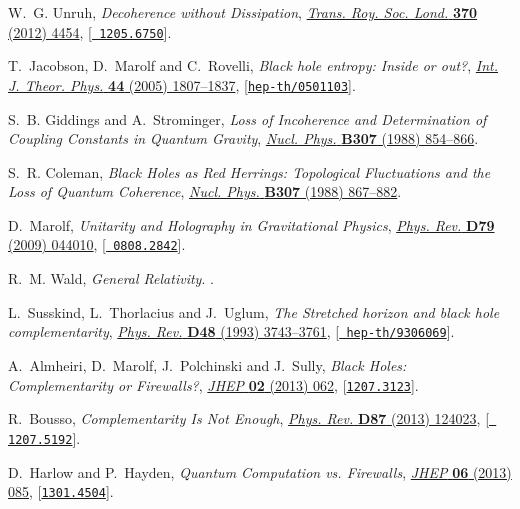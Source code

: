 \documentclass[12pt]{article}
\begin{document}
\begin{thebibliography}{100}
W.~G. Unruh, \emph{{Decoherence without Dissipation}},
  \href{http://dx.doi.org/10.1098/rsta.2012.0163}{\emph{Trans. Roy. Soc. Lond.}
  {\bf 370} (2012) 4454}, [\href{http://arxiv.org/abs/1205.6750}{{\tt
  1205.6750}}].

T.~Jacobson, D.~Marolf and C.~Rovelli, \emph{{Black hole entropy: Inside or
  out?}}, \href{http://dx.doi.org/10.1007/s10773-005-8896-z}{\emph{Int. J.
  Theor. Phys.} {\bf 44} (2005) 1807--1837},
  [\href{http://arxiv.org/abs/hep-th/0501103}{{\tt hep-th/0501103}}].

S.~B. Giddings and A.~Strominger, \emph{{Loss of Incoherence and Determination
  of Coupling Constants in Quantum Gravity}},
  \href{http://dx.doi.org/10.1016/0550-3213(88)90109-5}{\emph{Nucl. Phys.} {\bf
  B307} (1988) 854--866}.

S.~R. Coleman, \emph{{Black Holes as Red Herrings: Topological Fluctuations and
  the Loss of Quantum Coherence}},
  \href{http://dx.doi.org/10.1016/0550-3213(88)90110-1}{\emph{Nucl. Phys.} {\bf
  B307} (1988) 867--882}.

D.~Marolf, \emph{{Unitarity and Holography in Gravitational Physics}},
  \href{http://dx.doi.org/10.1103/PhysRevD.79.044010}{\emph{Phys. Rev.} {\bf
  D79} (2009) 044010}, [\href{http://arxiv.org/abs/0808.2842}{{\tt
  0808.2842}}].

R.~M. Wald, \emph{{General Relativity}}.
.

L.~Susskind, L.~Thorlacius and J.~Uglum, \emph{{The Stretched horizon and black
  hole complementarity}},
  \href{http://dx.doi.org/10.1103/PhysRevD.48.3743}{\emph{Phys. Rev.} {\bf D48}
  (1993) 3743--3761}, [\href{http://arxiv.org/abs/hep-th/9306069}{{\tt
  hep-th/9306069}}].

A.~Almheiri, D.~Marolf, J.~Polchinski and J.~Sully, \emph{{Black Holes:
  Complementarity or Firewalls?}},
  \href{http://dx.doi.org/10.1007/JHEP02(2013)062}{\emph{JHEP} {\bf 02} (2013)
  062}, [\href{http://arxiv.org/abs/1207.3123}{{\tt 1207.3123}}].

R.~Bousso, \emph{{Complementarity Is Not Enough}},
  \href{http://dx.doi.org/10.1103/PhysRevD.87.124023}{\emph{Phys. Rev.} {\bf
  D87} (2013) 124023}, [\href{http://arxiv.org/abs/1207.5192}{{\tt
  1207.5192}}].

D.~Harlow and P.~Hayden, \emph{{Quantum Computation vs. Firewalls}},
  \href{http://dx.doi.org/10.1007/JHEP06(2013)085}{\emph{JHEP} {\bf 06} (2013)
  085}, [\href{http://arxiv.org/abs/1301.4504}{{\tt 1301.4504}}].


\end{thebibliography}
\end{document}
